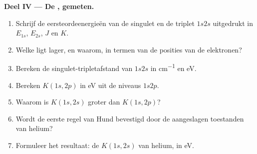 \begin{problem}
\medskip\noindent\textbf{Deel IV --- De , gemeten.}
\begin{enumerate}[resume]
  \item Schrijf de eersteordeenergieën van de singulet en de triplet $1s2s$
        uitgedrukt in $E_{1s}$, $E_{2s}$, $J$ en $K$.
  \item Welke ligt lager, en waarom, in termen van de posities van de
        elektronen?
  \item Bereken de singulet-tripletafstand van $1s2s$ in \unit{cm^{-1}} en eV.
  \item Bereken $K(1s,2p)$ in eV uit de niveaus $1s2p$.
  \item Waarom is $K(1s,2s)$ groter dan $K(1s,2p)$?
  \item Wordt de eerste regel van Hund bevestigd door de aangeslagen
        toestanden van helium?
  \item Formuleer het resultaat: de  $K(1s,2s)$ van
        helium, in eV.
\end{enumerate}
\end{problem}
